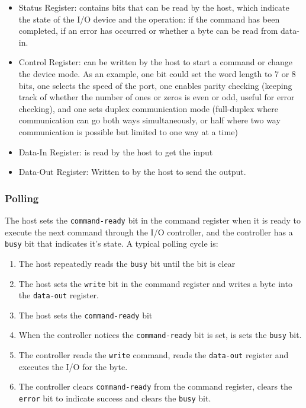 \documentclass[]{article}
\begin{document}
        \begin{itemize}
            \item Status Register: contains bits that can be read by the host, which indicate the state of the I/O device and the operation: if the command has been completed, if an error has occurred or whether a byte can be read from data-in.
            \item Control Register: can be written by the host to start a command or change the device mode. As an example, one bit could set the word length to 7 or 8 bits, one selects the speed of the port, one enables parity checking (keeping track of whether the number of ones or zeros is even or odd, useful for error checking), and one sets duplex communication mode (full-duplex where communication can go both ways simultaneously, or half where two way communication is possible but limited to one way at a time)
            \item Data-In Register: is read by the host to get the input
            \item Data-Out Register: Written to by the host to send the output.
        \end{itemize}

        \subsubsection{Polling}

            The host sets the \texttt{command-ready} bit in the command register when it is ready to execute the next command through the I/O controller, and the controller has a \texttt{busy} bit that indicates it's state. A typical polling cycle is:

            \begin{enumerate}
                \item The host repeatedly reads the \texttt{busy} bit until the bit is clear
                \item The host sets the \texttt{write} bit in the command register and writes a byte into the \texttt{data-out} register.
                \item The host sets the \texttt{command-ready} bit
                \item When the controller notices the \texttt{command-ready} bit is set, is sets the \texttt{busy} bit.
                \item The controller reads the \texttt{write} command, reads the \texttt{data-out} register and executes the I/O for the byte.
                \item The controller clears \texttt{command-ready} from the command register, clears the \texttt{error} bit to indicate success and clears the \texttt{busy} bit.
            \end{enumerate}
\end{document}
